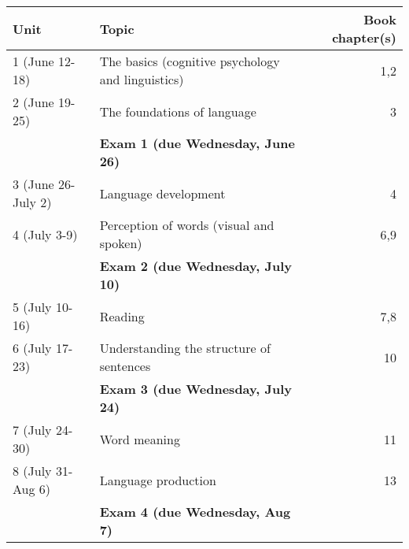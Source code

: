 \documentclass[10pt]{article}
\begin{document}
\begin{center}
\begin{tabular}{llr}
Unit & Topic & Book chapter(s)\\
\hline
1 (June 12-18) & The basics (cognitive psychology and linguistics) & 1,2\\
2 (June 19-25) & The foundations of language & 3\\
 & \textbf{Exam 1 (due Wednesday, June 26)} & \\
3 (June 26-July 2) & Language development & 4\\
4 (July 3-9) & Perception of words (visual and spoken) & 6,9\\
 & \textbf{Exam 2 (due Wednesday, July 10)} & \\
5 (July 10-16) & Reading & 7,8\\
6 (July 17-23) & Understanding the structure of sentences & 10\\
 & \textbf{Exam 3 (due Wednesday, July 24)} & \\
7 (July 24-30) & Word meaning & 11\\
8 (July 31-Aug 6) & Language production & 13\\
 & \textbf{Exam 4 (due Wednesday, Aug 7)} & \\
\end{tabular}
\end{center}
\end{document}
